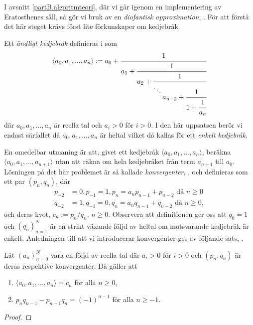
I avsnitt \ref{partB.algoritmteori}, där vi går igenom en implementering av Eratosthenes såll, så gör vi bruk av en \textit{diofantisk approximation}, \cite[Algoritm 4]{HaraldSieve}. För att förstå det här steget krävs först lite förkunskaper om kedjebråk. 

Ett \textit{ändligt kedjebråk} definieras i \cite[Definition 20.1]{Lindahl} som
\begin{align*}
    \langle a_0, a_1, ..., a_n \rangle := a_0 + \cfrac{1}{a_1 + \cfrac{1}{a_2 + \cfrac{1}{\ddots \raisebox{-3mm}{$a_{n-2}+\cfrac{1}{1 + \cfrac{1}{a_n}}$}}}}
\end{align*}
där \(a_0, a_1, ..., a_n\) är reella tal och \(a_i > 0\) för \(i > 0\). I den här uppsatsen berör vi endast särfallet då \(a_0, a_1, ..., a_n\) är heltal vilket då kallas för ett \textit{enkelt kedjebråk}. 

En omedelbar utmaning är att, givet ett kedjebråk \(\langle a_0, a_1, ..., a_n \rangle \), beräkna \(\langle a_0, a_1, ..., a_{n+1} \rangle \) utan att räkna om hela kedjebråket från term \(a_{n+1}\) till \(a_0\). Lösningen på det här problemet är så kallade \textit{konvergenter}, \cite[Definition 20.4]{Lindahl}, och definieras som ett par \((p_n,q_n)\), där
\begin{align*}
    p_{-2} &= 0, p_{-1} = 1, p_n = a_n p_{n-1} + p_{n-2} \text{ då } n \geq 0 \\
    q_{-2} &= 1, q_{-1} = 0, q_n = a_n q_{n-1} + q_{n-2} \text{ då } n \geq 0,
\end{align*}
och deras kvot, \(c_n := p_n / q_n\), \(n \geq 0\). Observera att definitionen ger oss att \(q_0 = 1\) och \((q_n)_{n=1}^{N}\) är en strikt växande följd av heltal om motsvarande kedjebråk är enkelt. Anledningen till att vi introducerar konvergenter ges av följande sats, \cite[Sats 20.5i) och ii)]{Lindahl},
\begin{theorem} \label{app.konvergenter}
    Låt \((a_n)_{n=0}^{N}\) vara en följd av reella tal där \(a_i > 0\) för \(i > 0\) och \((p_n, q_n)\) är deras respektive konvergenter. Då gäller att
    \begin{enumerate}
        \item \(\langle a_0, a_1, ..., a_n \rangle = c_n\) för alla \(n \geq 0\),
        \item \(p_n q_{n-1} - p_{n-1} q_n = (-1)^{n-1}\) för alla \(n \geq -1\).
    \end{enumerate}
\end{theorem}
\begin{proof}
\end{proof}

